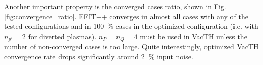 Another important property is the converged cases ratio, shown in Fig. \ref{fig:convergence_ratio}. EFIT++ converges in almost all cases with any of the tested configurations and in 100~\% cases in the optimized configuration (i.e. with $n_{p'}=2$ for diverted plasmas). $n_P = n_Q = 4$ must be used in VacTH unless the number of non-converged cases is too large. 
Quite interestingly, optimized VacTH convergence rate drops significantly around 2~\% input noise.



